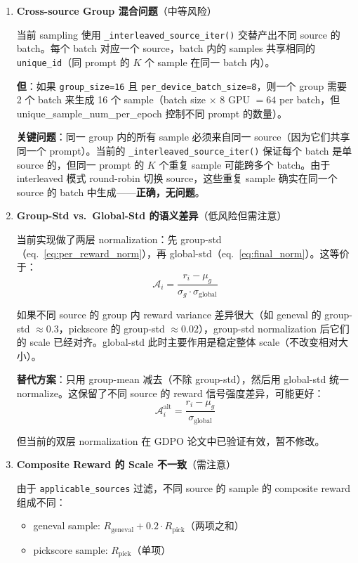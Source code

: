 \documentclass[11pt,a4paper]{article}
\theoremstyle{definition}
\begin{document}
\begin{enumerate}[leftmargin=1.5em]

\item \textbf{Cross-source Group 混合问题}（中等风险）

当前 sampling 使用 \texttt{\_interleaved\_source\_iter()} 交替产出不同 source 的 batch。每个 batch 对应一个 source，batch 内的 samples 共享相同的 \texttt{unique\_id}（同 prompt 的 $K$ 个 sample 在同一 batch 内）。

\textbf{但}：如果 \texttt{group\_size=16} 且 \texttt{per\_device\_batch\_size=8}，则一个 group 需要 2 个 batch 来生成 16 个 sample（batch size $\times$ 8 GPU $= 64$ per batch，但 unique\_sample\_num\_per\_epoch 控制不同 prompt 的数量）。

\textbf{关键问题}：同一 group 内的所有 sample 必须来自同一 source（因为它们共享同一个 prompt）。当前的 \texttt{\_interleaved\_source\_iter()} 保证每个 batch 是单 source 的，但同一 prompt 的 $K$ 个重复 sample 可能跨多个 batch。由于 interleaved 模式 round-robin 切换 source，这些重复 sample 确实在同一个 source 的 batch 中生成——\textbf{正确，无问题}。

\item \textbf{Group-Std vs.\ Global-Std 的语义差异}（低风险但需注意）

当前实现做了两层 normalization：先 group-std（eq.~\ref{eq:per_reward_norm}），再 global-std（eq.~\ref{eq:final_norm}）。这等价于：
\begin{equation}
\mathcal{A}_i = \frac{r_i - \mu_g}{\sigma_g \cdot \sigma_{\mathrm{global}}}
\end{equation}

如果不同 source 的 group 内 reward variance 差异很大（如 geneval 的 group-std $\approx 0.3$，pickscore 的 group-std $\approx 0.02$），group-std normalization 后它们的 scale 已经对齐。global-std 此时主要作用是稳定整体 scale（不改变相对大小）。

\textbf{替代方案}：只用 group-mean 减去（不除 group-std），然后用 global-std 统一 normalize。这保留了不同 source 的 reward 信号强度差异，可能更好：
\begin{equation}
\mathcal{A}_i^{\mathrm{alt}} = \frac{r_i - \mu_g}{\sigma_{\mathrm{global}}}
\end{equation}

但当前的双层 normalization 在 GDPO 论文中已验证有效，暂不修改。

\item \textbf{Composite Reward 的 Scale 不一致}（需注意）

由于 \texttt{applicable\_sources} 过滤，不同 source 的 sample 的 composite reward 组成不同：
\begin{itemize}
\item geneval sample: $R_{\mathrm{geneval}} + 0.2 \cdot R_{\mathrm{pick}}$（两项之和）
\item pickscore sample: $R_{\mathrm{pick}}$（单项）
\end{itemize}


\end{enumerate}
\end{document}
